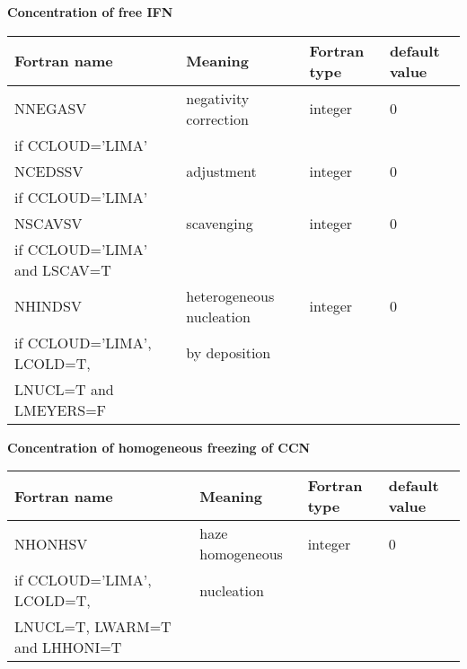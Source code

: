 \textbf{Concentration of free IFN}
\begin{longtable} {|p{}|p{}|>{\centering}p{}|p{}<{\centering}|}
\hline
Fortran name & Meaning & Fortran type & default value \\
\hline \hline
\endhead
NNEGASV & negativity correction& integer & 0 \\ \nopagebreak
if CCLOUD='LIMA' &&& \\\hline

NCEDSSV & adjustment & integer & 0 \\ \nopagebreak
if CCLOUD='LIMA' &&& \\\hline

NSCAVSV & scavenging & integer & 0 \\ \nopagebreak
if CCLOUD='LIMA' and LSCAV=T &&& \\\hline

NHINDSV & heterogeneous nucleation & integer & 0 \\ \nopagebreak
if CCLOUD='LIMA', LCOLD=T, &by deposition&& \\ \nopagebreak
LNUCL=T and LMEYERS=F &&& \\\hline
\end{longtable}

\textbf{Concentration of homogeneous freezing of CCN}
\begin{longtable} {|p{}|p{}|>{\centering}p{}|p{}<{\centering}|}
\hline
Fortran name & Meaning & Fortran type & default value \\
\hline \hline
\endhead
NHONHSV & haze homogeneous  & integer & 0 \\ \nopagebreak
if CCLOUD='LIMA', LCOLD=T, &nucleation&& \\ \nopagebreak
LNUCL=T, LWARM=T and LHHONI=T &&& \\\hline
\end{longtable}

